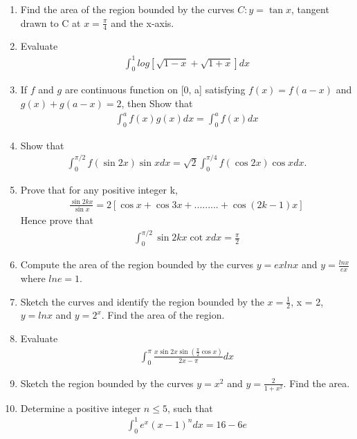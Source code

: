\begin{enumerate}[label=\arabic*.,ref=\thesubsection.\theenumi]
\item Find the area of the region bounded by the curves $C: y = \tan x$, tangent drawn to C at $x = \frac{\pi}{4}$ and the x-axis.

\item Evaluate
\begin{align*}
\int_{0}^{1}log[\sqrt{1 - x} + \sqrt{1 + x}]dx
\end{align*}

\item If $f$ and $g$ are continuous function on [0, a] satisfying $f(x) = f(a - x)$ and $g(x) + g(a - x) = 2$, then Show that 
\begin{align*}
\int_{0}^{a}f(x)g(x)dx = \int_{0}^{a}f(x)dx
\end{align*}

\item Show that
\begin{align*}
\int_{0}^{\pi/2}f(\sin 2x)\sin x dx = \sqrt{2}\int_{0}^{\pi/4}f(\cos 2x)\cos x dx.
\end{align*}

\item Prove that for any positive integer k,
\begin{align*}
\frac{\sin 2kx}{\sin x} = 2[\cos x + \cos 3x + .........+\cos(2k - 1)x]
\end{align*}
Hence prove that
\begin{align*}
\int_{0}^{\pi/2}\sin 2kx \cot x dx = \frac{\pi}{2}
\end{align*}

\item Compute the area of the region bounded by the curves $y = ex lnx$ and $y = \frac{lnx}{ex}$ where $lne = 1$.

\item Sketch the curves and identify the region bounded by the $x = \frac{1}{2}$, x = 2, $y = lnx$ and $y = 2^x$. Find the area of the region.  

\item Evaluate
\begin{align*}
\int_{0}^{\pi}\frac{x \sin 2x \sin(\frac{\pi}{2}\cos x)}{2x - \pi}dx
\end{align*}

\item Sketch the region bounded by the curves $y = x^2$ and $y = \frac{2}{1 + x^2}$. Find the area.

\item Determine a positive integer $n \leq 5$, such that
\begin{align*}
\int_{0}^{1}e^x(x - 1)^{n}dx = 16 - 6e
\end{align*}


\end{enumerate}
